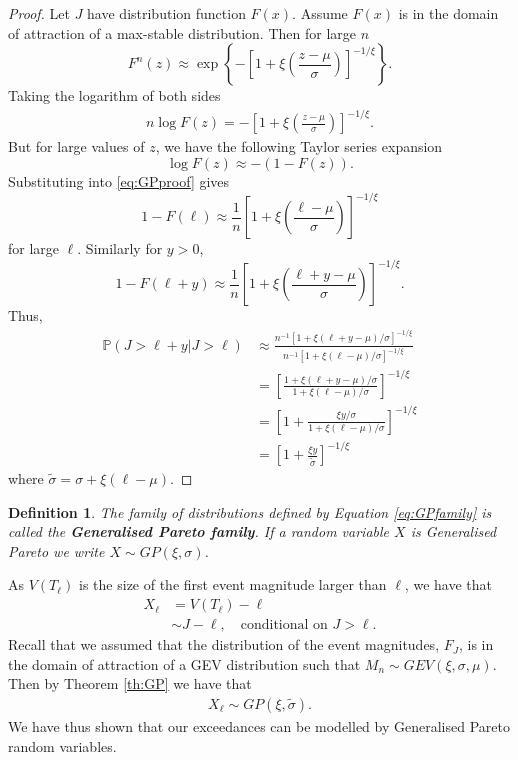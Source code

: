 \documentclass[honours,12pt]{unswthesis}
\newcommand{\PP}{\mathbb{P}}
\newcommand{\1}{\mathbf 1}
\newtheorem{definition}[equation]{Definition}
\numberwithin{equation}{section}
\theoremstyle{definition}
\theoremstyle{remark}
\begin{document}
\begin{proof}\cite{Leadbetter1983}
Let $J$ have distribution function $F(x)$. Assume $F(x)$ is in the domain of attraction of a max-stable distribution. Then for large $n$
\[
	F^n(z)\approx\exp\left\{-\left[1+\xi\left(\frac{z-\mu}{\sigma}\right)\right]^{-1/\xi}\right\}.
\]
Taking the logarithm of both sides
\begin{align}\label{eq:GPproof}
	n \log F(z) = -\left[1+\xi\left(\frac{z-\mu}{\sigma}\right)\right]^{-1/\xi}.
\end{align}
But for large values of $z$, we have the following Taylor series expansion
\[
	\log F(z)\approx -(1-F(z)).
\]
Substituting into \ref{eq:GPproof} gives
\[
	1-F(\ell) \approx \frac{1}{n}\left[1+\xi\left(\frac{\ell-\mu}{\sigma}\right)\right]^{-1/\xi}
\]
for large $\ell$. Similarly for $y>0$,
\[
	1-F(\ell+y) \approx \frac{1}{n}\left[1+\xi\left(\frac{\ell+y-\mu}{\sigma}\right)\right]^{-1/\xi}.
\]
Thus,
\begin{align*}
	\PP(J>\ell+y|J>\ell) &\approx \frac{n^{-1}[1+\xi(\ell+y-\mu)/\sigma]^{-1/\xi}}{n^{-1}[1+\xi(\ell-\mu)/\sigma]^{-1/\xi}}\\
	&=\left[\frac{1+\xi(\ell+y-\mu)/\sigma}{1+\xi(\ell-\mu)/\sigma}\right]^{-1/\xi}\\
	&=\left[1+\frac{\xi y/\sigma}{1+\xi(\ell-\mu)/\sigma}\right]^{-1/\xi}\\
	&=\left[1+\frac{\xi y}{\tilde \sigma}\right]^{-1/\xi}
\end{align*}
where $\tilde\sigma=\sigma+\xi(\ell-\mu)$.
\end{proof}

\begin{definition}
The family of distributions defined by Equation \ref{eq:GPfamily} is called the \textbf{Generalised Pareto family}. If a random variable $X$ is Generalised Pareto we write $X\sim GP(\xi,\sigma)$.\\
\end{definition}
\noindent As $V(T_\ell)$ is the size of the first event magnitude larger than $\ell$, we have that
\begin{align*}
	X_\ell&=V(T_\ell)-\ell\\
		  &\sim J-\ell, \quad \textrm{conditional on $J>\ell$}.
\end{align*}
Recall that we assumed that the distribution of the event magnitudes, $F_J$, is in the domain of attraction of a GEV distribution such that $M_n \sim GEV(\xi,\sigma,\mu)$. Then by Theorem \ref{th:GP} we have that 
\begin{align}
X_\ell\sim GP(\xi,\tilde \sigma).
\end{align}
We have thus shown that our exceedances can be modelled by Generalised Pareto random variables.
\end{document}
